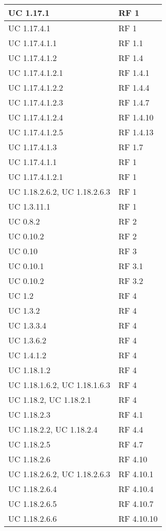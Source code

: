 {\begin{longtable} [c]{| p{4cm} | p{4cm} |}
 \hline 
UC 1.17.1 & RF 1\\ 
 \hline 
UC 1.17.4.1 & RF 1\\ 
 \hline 
UC 1.17.4.1.1 & RF 1.1\\ 
 \hline 
UC 1.17.4.1.2 & RF 1.4\\ 
 \hline 
UC 1.17.4.1.2.1 & RF 1.4.1\\ 
 \hline 
UC 1.17.4.1.2.2 & RF 1.4.4\\ 
 \hline 
UC 1.17.4.1.2.3 & RF 1.4.7\\ 
 \hline 
UC 1.17.4.1.2.4 & RF 1.4.10\\ 
 \hline 
UC 1.17.4.1.2.5 & RF 1.4.13\\ 
 \hline 
UC 1.17.4.1.3 & RF 1.7\\ 
 \hline 
UC 1.17.4.1.1 & RF 1\\ 
 \hline 
UC 1.17.4.1.2.1 & RF 1\\ 
 \hline 
UC 1.18.2.6.2, UC 1.18.2.6.3 & RF 1\\ 
 \hline 
UC 1.3.11.1 & RF 1\\ 
 \hline 
UC 0.8.2 & RF 2\\ 
 \hline 
UC 0.10.2 & RF 2\\ 
 \hline 
UC 0.10 & RF 3\\ 
 \hline 
UC 0.10.1 & RF 3.1\\ 
 \hline 
UC 0.10.2 & RF 3.2\\ 
 \hline 
UC 1.2 & RF 4\\ 
 \hline 
UC 1.3.2 & RF 4\\ 
 \hline 
UC 1.3.3.4 & RF 4\\ 
 \hline 
UC 1.3.6.2 & RF 4\\ 
 \hline 
UC 1.4.1.2 & RF 4\\ 
 \hline 
UC 1.18.1.2 & RF 4\\ 
 \hline 
UC 1.18.1.6.2, UC 1.18.1.6.3 & RF 4\\ 
 \hline 
UC 1.18.2, UC 1.18.2.1 & RF 4\\ 
 \hline 
UC 1.18.2.3 & RF 4.1\\ 
 \hline 
UC 1.18.2.2, UC 1.18.2.4 & RF 4.4\\ 
 \hline 
UC 1.18.2.5 & RF 4.7\\ 
 \hline 
UC 1.18.2.6 & RF 4.10\\ 
 \hline 
UC 1.18.2.6.2, UC 1.18.2.6.3 & RF 4.10.1\\ 
 \hline 
UC 1.18.2.6.4 & RF 4.10.4\\ 
 \hline 
UC 1.18.2.6.5 & RF 4.10.7\\ 
 \hline 
UC 1.18.2.6.6 & RF 4.10.10\\ 

\end{longtable}}
